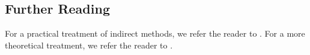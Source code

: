 
\subsection{Further Reading}

For a practical treatment of indirect methods, we refer the reader to \cite{bryson1975applied}. For a more theoretical treatment, we refer the reader to \cite{lee1967foundations}.